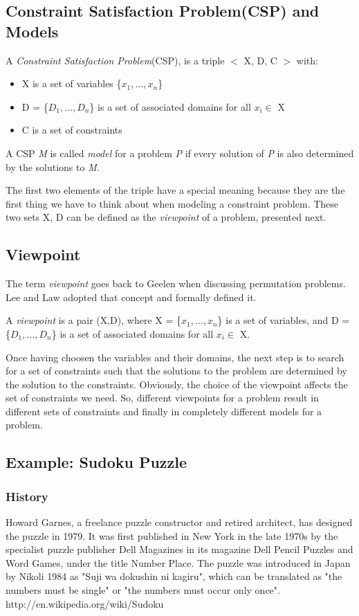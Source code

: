 \documentclass[a4paper,halfparskip]{scrartcl}
\begin{document}
\subsection{Constraint Satisfaction Problem(CSP) and Models}
A \emph{Constraint Satisfaction Problem}(CSP), is a triple
$<$ X, D, C $>$ with: 
\begin{itemize}
\item
X is a set of variables \{$x_1, \ldots, x_n$\}
\item
D = \{$ D_1, \ldots, D_n$\} is a set 
of associated domains for all $x_i \in$ X
\item
C is a set of constraints
\end{itemize}
A CSP \emph{M} is called \emph{model} for a problem \emph{P}
if every solution of \emph{P} is also determined by
the solutions to \emph{M}.

The first two elements of the triple have a special
meaning because they are the first thing we have to think
about when modeling a constraint problem. These two 
sets X, D can be defined as the \emph{viewpoint} of a
problem, presented next.
  
\subsection{Viewpoint}
\label{viewp}
The term \emph{viewpoint} goes back to Geelen \cite{6} when
discussing permutation problems. Lee and Law \cite{7} adopted
that concept and formally defined it.

A \emph{viewpoint} is a pair (X,D), where X = \{$x_1, \ldots, x_n$\} 
is a set of variables, and D = \{$ D_1, \ldots, D_n$\} is a set 
of associated domains for all $x_i \in$ X.

Once having choosen the variables and their domains, the next
step is to search for a set of constraints such that the solutions 
to the problem are determined by the solution to the constraints.
Obviously, the choice of the viewpoint affects the set of
constraints we need. So, different viewpoints for a problem
result in different sets of constraints and finally in completely
different models for a problem.
 

\subsection{Example: Sudoku Puzzle}
\label{sudoku-puzzle}
\subsubsection{History}
Howard Garnes, a freelance puzzle constructor and retired architect, has
designed the puzzle in 1979. It was first published in New York in the late 1970s by the specialist puzzle publisher Dell Magazines in its magazine Dell Pencil Puzzles and Word Games, under the title Number Place. 
The puzzle was introduced in Japan by Nikoli 1984 as "Suji wa dokushin ni kagiru", which can be translated as "the numbers must be single" or "the numbers must occur only once".
{http://en.wikipedia.org/wiki/Sudoku}
\end{document}

